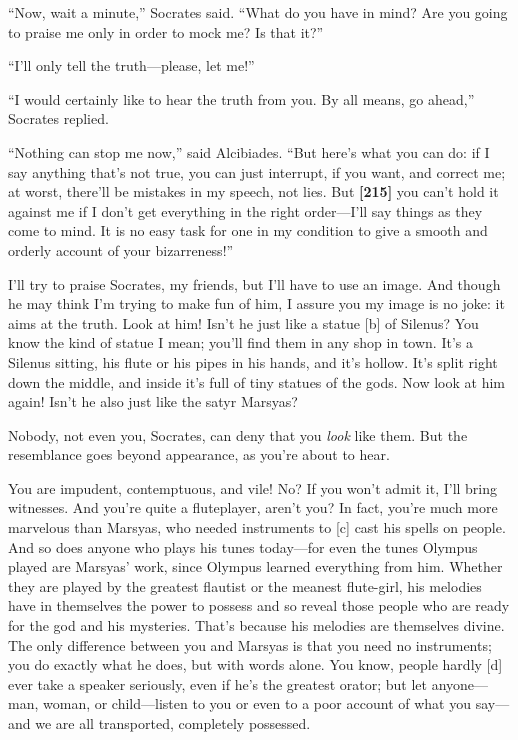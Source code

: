 “Now, wait a minute,” Socrates said. “What do you have in mind? Are you
going to praise me only in order to mock me? Is that it?”

“I'll only tell the truth---please, let me!”

“I would certainly like to hear the truth from you. By all means, go
ahead,” Socrates replied.

“Nothing can stop me now,” said Alcibiades. “But here's what you can do:
if I say anything that's not true, you can just interrupt, if you want,
and correct me; at worst, there'll be mistakes in my speech, not lies.
But {\bf {[}215{]}} you can't hold it against me if I don't get
everything in the right order---I'll say things as they come to mind. It
is no easy task for one in my condition to give a smooth and orderly
account of your bizarreness!”\crlf
\crlf

I'll try to praise Socrates, my friends, but I'll have to use an image.
And though he may think I'm trying to make fun of him, I assure you my
image is no joke: it aims at the truth. Look at him! Isn't he just like
a statue {[}b{]} of Silenus? You know the kind of statue I mean; you'll
find them in any shop in town. It's a Silenus sitting, his
flute or his pipes in
his hands, and it's hollow. It's split right down the middle, and inside
it's full of tiny statues of the gods. Now look at him again! Isn't he
also just like the satyr
Marsyas?

Nobody, not even you, Socrates, can deny that you {\em look} like them.
But the resemblance goes beyond appearance, as you're about to hear.

You are impudent, contemptuous, and vile! No? If you won't admit it,
I'll bring witnesses. And you're quite a fluteplayer, aren't you? In
fact, you're much more marvelous than Marsyas, who needed instruments to
{[}c{]} cast his spells on people. And so does anyone who plays his
tunes today---for even the tunes
Olympus played are
Marsyas' work, since Olympus learned everything from him. Whether they
are played by the greatest flautist or the meanest flute-girl, his
melodies have in themselves the power to possess and so reveal those
people who are ready for the god and his mysteries. That's because his
melodies are themselves divine. The only difference between you and
Marsyas is that you need no instruments; you do exactly what he does,
but with words alone. You know, people hardly {[}d{]} ever take a
speaker seriously, even if he's the greatest orator; but let
anyone---man, woman, or child---listen to you or even to a poor account
of what you say---and we are all transported, completely possessed.

